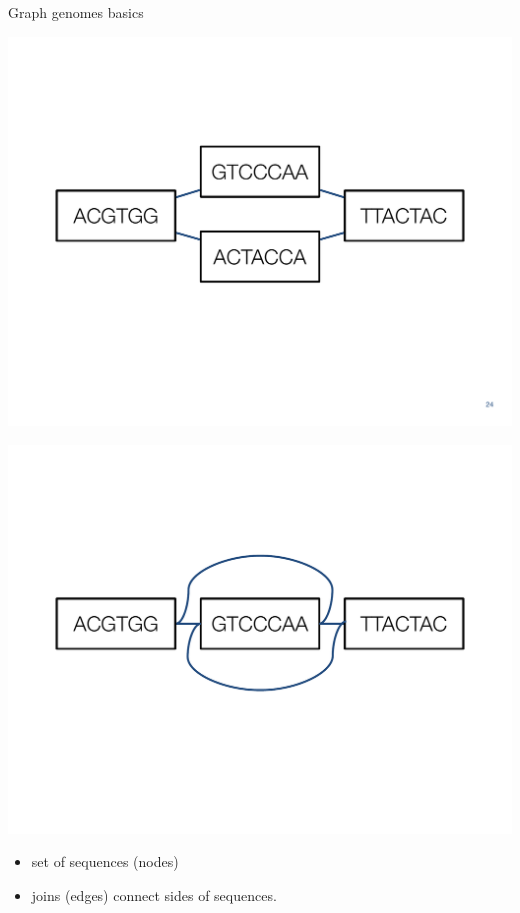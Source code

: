 \documentclass[10pt,
               hyperref={bookmarks=false,
                         bookmarksopen=false,
                         colorlinks=true,
                         linkcolor=blue,
                         urlcolor=blue},
               xcolor={svgnames,table}]{beamer}
\begin{document}
\begin{frame}{Graph genomes basics}
  \begin{center}
    \includegraphics[scale=0.30]{images/graph-genome-alt.pdf}
  \end{center}
  \begin{center}
    \includegraphics[scale=0.30]{images/graph-genome-inversion.pdf}
  \end{center}
  \begin{itemize}
  \item set of sequences (nodes)
  \item joins (edges) connect sides of sequences.
  \end{itemize}
\end{frame}
\end{document}
